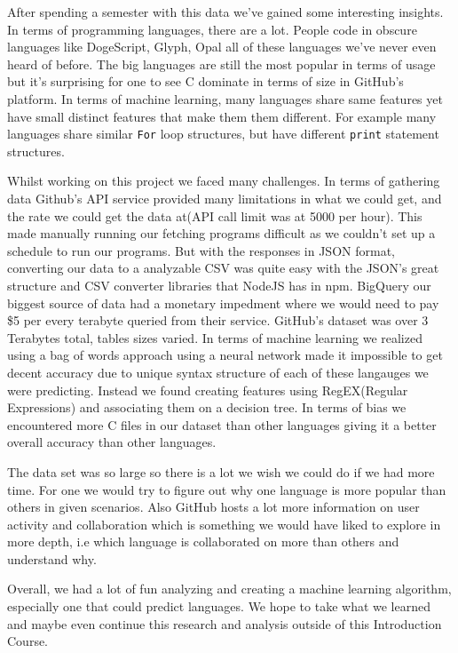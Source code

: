 \documentclass[11pt]{article}
\begin{document}
After spending a semester with this data we've gained some interesting
insights. In terms of programming languages, there are a lot. People
code in obscure languages like DogeScript, Glyph, Opal all of these
languages we've never even heard of before. The big languages are still
the most popular in terms of usage but it's surprising for one to see C
dominate in terms of size in GitHub's platform. In terms of machine
learning, many languages share same features yet have small distinct
features that make them them different. For example many languages share
similar \texttt{For} loop structures, but have different \texttt{print}
statement structures.

Whilst working on this project we faced many challenges. In terms of
gathering data Github's API service provided many limitations in what we
could get, and the rate we could get the data at(API call limit was at
5000 per hour). This made manually running our fetching programs
difficult as we couldn't set up a schedule to run our programs. But with
the responses in JSON format, converting our data to a analyzable CSV
was quite easy with the JSON's great structure and CSV converter
libraries that NodeJS has in npm. BigQuery our biggest source of data
had a monetary impedment where we would need to pay \$5 per every
terabyte queried from their service. GitHub's dataset was over 3
Terabytes total, tables sizes varied. In terms of machine learning we
realized using a bag of words approach using a neural network made it
impossible to get decent accuracy due to unique syntax structure of each
of these langauges we were predicting. Instead we found creating
features using RegEX(Regular Expressions) and associating them on a
decision tree. In terms of bias we encountered more C files in our
dataset than other languages giving it a better overall accuracy than
other languages.

The data set was so large so there is a lot we wish we could do if we
had more time. For one we would try to figure out why one language is
more popular than others in given scenarios. Also GitHub hosts a lot
more information on user activity and collaboration which is something
we would have liked to explore in more depth, i.e which language is
collaborated on more than others and understand why.

Overall, we had a lot of fun analyzing and creating a machine learning
algorithm, especially one that could predict languages. We hope to take
what we learned and maybe even continue this research and analysis
outside of this Introduction Course.
\end{document}
